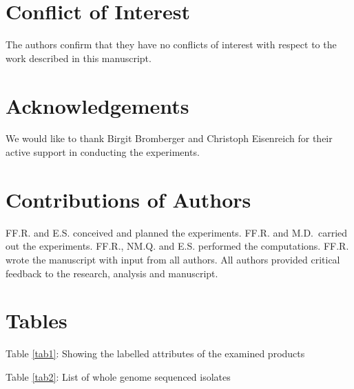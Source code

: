 \documentclass[preprint,3p,
a4paper]{elsarticle} %
\begin{document}
\hypertarget{conflict-of-interest}{%
\section{Conflict of Interest}\label{conflict-of-interest}}

The authors confirm that they have no conflicts of interest with respect
to the work described in this manuscript.

\hypertarget{acknowledgements}{%
\section{Acknowledgements}\label{acknowledgements}}

We would like to thank Birgit Bromberger and Christoph Eisenreich for
their active support in conducting the experiments.

\hypertarget{contributions-of-authors}{%
\section{Contributions of Authors}\label{contributions-of-authors}}

FF.R. and E.S. conceived and planned the experiments. FF.R. and
M.D.~carried out the experiments. FF.R., NM.Q. and E.S. performed the
computations. FF.R. wrote the manuscript with input from all authors.
All authors provided critical feedback to the research, analysis and
manuscript.

\hypertarget{tables}{%
\section{Tables}\label{tables}}

Table \ref{tab1}: Showing the labelled attributes of the examined
products

Table \ref{tab2}: List of whole genome sequenced isolates

\singlespacing
\end{document}
